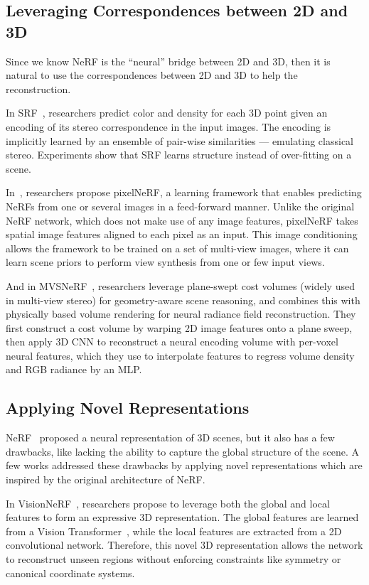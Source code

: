 \documentclass[10pt,twocolumn,letterpaper]{article}
\begin{document}
\subsection{Leveraging Correspondences between 2D and 3D}

Since we know NeRF is the “neural” bridge between 2D and 3D, then it is natural to use the correspondences between 2D and 3D to help the reconstruction.

In SRF~\cite{SRF}, researchers predict color and density for each 3D point given an encoding of its stereo correspondence in the input images. The encoding is implicitly learned by an ensemble of pair-wise similarities — emulating classical stereo. Experiments show that SRF learns structure instead of over-fitting on a scene.

In~\cite{yu2020pixelnerf}, researchers propose pixelNeRF, a learning framework that enables predicting NeRFs from one or several images in a feed-forward manner. Unlike the original NeRF network, which does not make use of any image features, pixelNeRF takes spatial image features aligned to each pixel as an input. This image conditioning allows the framework to be trained on a set of multi-view images, where it can learn scene priors to perform view synthesis from one or few input views.

And in MVSNeRF~\cite{mvsnerf}, researchers leverage plane-swept cost volumes (widely used in multi-view stereo) for geometry-aware scene reasoning, and combines this with physically based volume rendering for neural radiance field reconstruction.
They first construct a cost volume by warping 2D image features onto a plane sweep, then apply 3D CNN to reconstruct a neural encoding volume with per-voxel neural features, which they use to interpolate features to regress volume density and RGB radiance by an MLP.

\subsection{Applying Novel Representations}

NeRF~\cite{mildenhall2020nerf} proposed a neural representation of 3D scenes, but it also has a few drawbacks, like lacking the ability to capture the global structure of the scene. A few works addressed these drawbacks by applying novel representations which are inspired by the original architecture of NeRF.

In VisionNeRF~\cite{lin2023visionnerf}, researchers propose to leverage both the global and local features to form an expressive 3D representation. The global features are learned from a Vision Transformer~\cite{dosovitskiy2021image}, while the local features are extracted from a 2D convolutional network. 
Therefore, this novel 3D representation allows the network to reconstruct unseen regions without enforcing constraints like symmetry or canonical coordinate systems.
\end{document}
